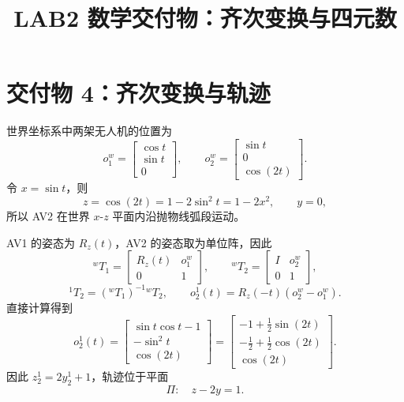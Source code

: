 \documentclass[UTF8,a4paper,11pt]{ctexart}
\title{LAB2 数学交付物：齐次变换与四元数}
\author{}
\date{}
\newcommand{\oz}{o_2^1(t)}
\begin{document}
\maketitle

\section{交付物 4：齐次变换与轨迹}

世界坐标系中两架无人机的位置为
\[
 o_1^w=\begin{bmatrix}\cos t\\\sin t\\0\end{bmatrix},\qquad
 o_2^w=\begin{bmatrix}\sin t\\0\\\cos(2t)\end{bmatrix}.
\]
令 $x=\sin t$，则
\[
 z=\cos(2t)=1-2\sin^2t=1-2x^2,\qquad y=0,
\]
所以 AV2 在世界 $x$-$z$ 平面内沿抛物线弧段运动。

AV1 的姿态为 $R_z(t)$，AV2 的姿态取为单位阵，因此
\[
{}^wT_1=\begin{bmatrix}R_z(t)&o_1^w\\0&1\end{bmatrix},\qquad
{}^wT_2=\begin{bmatrix}I&o_2^w\\0&1\end{bmatrix},
\]
\[
{}^1T_2=({}^wT_1)^{-1}{}^wT_2,\qquad
\oz=R_z(-t)(o_2^w-o_1^w).
\]
直接计算得到
\[
\oz=\begin{bmatrix}
\sin t\cos t-1\\-\sin^2t\\\cos(2t)
\end{bmatrix}
=\begin{bmatrix}
-1+\frac12\sin(2t)\\
-\frac12+\frac12\cos(2t)\\
\cos(2t)
\end{bmatrix}.
\]
因此 $z_2^1=2y_2^1+1$，轨迹位于平面
\[
\Pi:\quad z-2y=1.
\]
\end{document}
